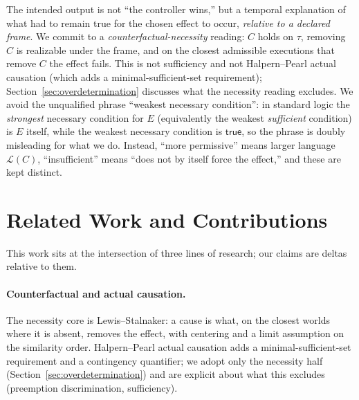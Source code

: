 \documentclass[11pt]{article}
\theoremstyle{remark}
\newcommand{\Lang}{\mathcal{L}}
\newcommand{\True}{\mathsf{true}}
\begin{document}
The intended output is not ``the controller wins,'' but a temporal explanation of
what had to remain true for the chosen effect to occur, \emph{relative to a
declared frame}. We commit to a \emph{counterfactual-necessity} reading: \(C\)
holds on \(\tau\), removing \(C\) is realizable under the frame, and on the
closest admissible executions that remove \(C\) the effect fails. This is not
sufficiency and not Halpern--Pearl actual causation (which adds a
minimal-sufficient-set requirement); Section~\ref{sec:overdetermination} discusses
what the necessity reading excludes. We avoid the unqualified phrase ``weakest
necessary condition'': in standard logic the \emph{strongest} necessary condition
for \(E\) (equivalently the weakest \emph{sufficient} condition) is \(E\) itself,
while the weakest necessary condition is \(\True\), so the phrase is doubly
misleading for what we do. Instead, ``more permissive'' means larger language
\(\Lang(C)\), ``insufficient'' means ``does not by itself force the effect,'' and
these are kept distinct.

\section{Related Work and Contributions}
\label{sec:related}

This work sits at the intersection of three lines of research; our claims are
deltas relative to them.

\paragraph{Counterfactual and actual causation.} The necessity core is
Lewis--Stalnaker: a cause is what, on the closest worlds where it is absent,
removes the effect, with centering and a limit assumption on the similarity
order. Halpern--Pearl actual causation adds a minimal-sufficient-set requirement
and a contingency quantifier; we adopt only the necessity half
(Section~\ref{sec:overdetermination}) and are explicit about what this excludes
(preemption discrimination, sufficiency).
\end{document}
